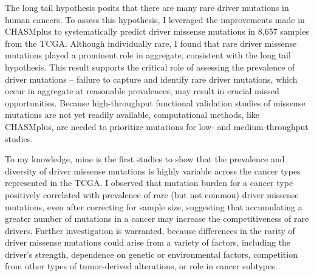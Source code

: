 The long tail hypothesis \cite{RN27, RN35} posits that there are many rare driver mutations in human cancers. To assess this hypothesis, I leveraged the improvements made in CHASMplus to systematically predict driver missense mutations in 8,657 samples from the TCGA. Although individually rare, I found that rare driver missense mutations played a prominent role in aggregate, consistent with the long tail hypothesis. This result supports the critical role of assessing the prevalence of driver mutations -- failure to capture and identify rare driver mutations, which occur in aggregate at reasonable prevalences, may result in crucial missed opportunities.   Because high-throughput functional validation studies of missense mutations are not yet readily available, computational methods, like CHASMplus, are needed to prioritize mutations for low- and medium-throughput studies. 

To my knowledge, mine is the first studies to show that the prevalence and diversity of driver missense mutations is highly variable across the cancer types represented in the TCGA.  I observed that mutation burden for a cancer type positively correlated with prevalence of rare (but not common) driver missense mutations, even after correcting for sample size, suggesting that accumulating a greater number of mutations in a cancer may increase the competitiveness of rare drivers. Further investigation is warranted, because differences in the rarity of driver missense mutations could arise from a variety of factors, including the driver's strength, dependence on genetic or environmental factors, competition from other types of tumor-derived alterations, or role in cancer subtypes.
